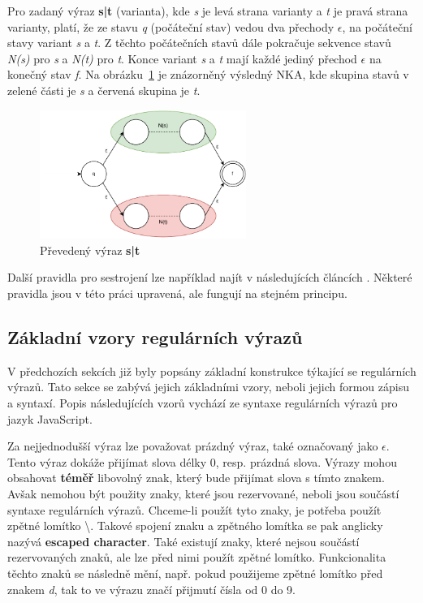 Pro zadaný výraz \textbf{s|t} (varianta), kde \textit{s} je levá strana varianty a \textit{t} je pravá strana varianty, platí, že ze stavu \textit{q} (počáteční stav) vedou dva přechody
\textit{$\epsilon$}, na počáteční stavy variant \textit{s} a \textit{t}. 
Z těchto počátečních stavů dále pokračuje sekvence stavů \textit{N(s)} pro \textit{s} a \textit{N(t)} pro \textit{t}.
Konce variant \textit{s} a \textit{t} mají každé jediný přechod \textit{$\epsilon$} na konečný stav \textit{f}.
Na obrázku~\ref{fig:NFAunion} je znázorněný výsledný NKA, kde skupina stavů v zelené části je \textit{s} a červená skupina je \textit{t}.
\begin{figure}[!h]
	\centering
	\includegraphics[width=0.6\textwidth]{Figures/NFA_union.pdf}
	\caption{Převedený výraz \textbf{s|t}}
	\label{fig:NFAunion}
\end{figure}

Další pravidla pro sestrojení lze například najít v následujících článcích \cite{Thompson1,Thompson2}.
Některé pravidla jsou v této práci upravená, ale fungují na stejném principu.

\subsection*{Základní vzory regulárních výrazů}
V předchozích sekcích již byly popsány základní konstrukce týkající se regulárních výrazů.
Tato sekce se zabývá jejich základními vzory, neboli jejich formou zápisu a syntaxí.
Popis následujících vzorů vychází ze syntaxe regulárních výrazů pro jazyk JavaScript.

Za nejjednodušší výraz lze považovat prázdný výraz, také označovaný jako $\epsilon$. 
Tento výraz dokáže přijímat slova délky 0, resp. prázdná slova.
Výrazy mohou obsahovat \textbf{téměř} libovolný znak, který bude přijímat slova s tímto znakem. 
Avšak nemohou být použity znaky, které jsou rezervované, neboli jsou součástí syntaxe regulárních výrazů.
Chceme-li použít tyto znaky, je potřeba použít zpětné lomítko \textbackslash. 
Takové spojení znaku a zpětného lomítka se pak anglicky nazývá \textbf{escaped character}.
Také existují znaky, které nejsou součástí rezervovaných znaků, ale lze před nimi použít zpětné lomítko.
Funkcionalita těchto znaků se následně mění, např. pokud použijeme zpětné lomítko před znakem \textit{d}, tak to ve výrazu značí přijmutí čísla od 0 do 9.

